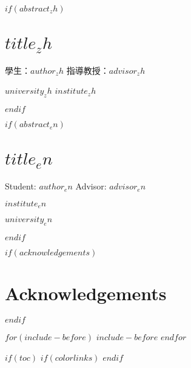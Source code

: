 \documentclass[$if(fontsize)$$fontsize$,$endif$$if(lang)$$babel-lang$,$endif$$if(papersize)$$papersize$paper,$endif$$for(classoption)$$classoption$$sep$,$endfor$]{$documentclass$}
\def\LARGE{\fontsize{20}{30}\selectfont}  %
\def\large{\fontsize{14}{21}\selectfont}  %
\begin{document}
\newcommand\mainmatter{
    \cleardoublepage
    \pagenumbering{arabic}
}

\newcommand\backmatter{
    \if@openright
        \cleardoublepage
    \else
        \clearpage
    \fi
}

\frontmatter

$if(abstract_zh)$
\renewcommand{\abstractname}{\LARGE\center 中文摘要}
\chapter*{\normalfont $title_zh$}
\vspace{1cm}
\large\centerline{學生：$author_zh$ \hfill 指導教授：$advisor_zh$}
\vspace{1.5cm}
\large\centerline{$university_zh$ $institute_zh$}
\vspace{1cm}
\centerline{\LARGE{\textbf{摘要}}}
\large{$abstract_zh$}
$endif$

$if(abstract_en)$
\renewcommand{\abstractname}{\LARGE\center Abstract}
\chapter*{\normalfont $title_en$}
\vspace{1cm}
\large\centerline{Student: $author_en$ \hfill Advisor: $advisor_en$}
\vspace{1.5cm}
\large\centerline{$institute_en$}
\large\centerline{$university_en$}
\vspace{1cm}
\centerline{\LARGE{\textbf{Abstract}}}
\large{$abstract_en$}
$endif$

$if(acknowledgements)$
\renewcommand{\abstractname}{\LARGE\center Acknowledgements}
\chapter*{Acknowledgements}
\large{$acknowledgements$}
$endif$

$for(include-before)$
$include-before$
$endfor$

$if(toc)$
\begingroup
\renewcommand{\contentsname}{\vspace{-1.2cm}\center Table of Content \addcontentsline{toc}{chapter}{Table of Content}}
\renewcommand{\numberline}[1]{~#1\hspace*{1em}}
$if(colorlinks)$
\hypersetup{linkcolor=$if(toccolor)$$toccolor$$else$black$endif$}
$endif$
\setcounter{tocdepth}{$toc-depth$}
\tableofcontents
\end{document}
